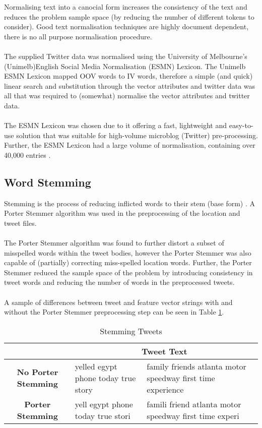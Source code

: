 \documentclass[11pt]{article}
\begin{document}
Normalising text into a canocial form increases the consistency of the text and reduces the problem sample space (by reducing the number of different tokens to consider). Good text normalisation techniques are highly document dependent, there is no all purpose normalisation procedure.\\\\
The supplied Twitter data was normalised using the University of Melbourne's (Unimelb)English Social Media Normalisation (ESMN) Lexicon. The Unimelb ESMN Lexicon mapped OOV words to IV words, therefore a simple (and quick) linear search and substitution through the vector attributes and twitter data was all that was required to (somewhat) normalise the vector attributes and twitter data.\\\\
The ESMN Lexicon was chosen due to it offering a fast, lightweight and easy-to-use solution that was suitable for high-volume microblog (Twitter) pre-processing. Further, the ESMN Lexicon had a large volume of normalisation, containing over 40,000 entries \citep{bald-ESMNL}. 

\subsection{Word Stemming}
\label{subsec:stem}

Stemming is the process of reducing inflicted words to their stem (base form) \citep{pm-stem}. A Porter Stemmer algorithm was used in the preprocessing of the location and tweet files. \\\\
The Porter Stemmer algorithm was found to further distort a subset of misspelled words within the tweet bodies, however the Porter Stemmer was also capable of (partially) correcting miss-spelled location words. Further, the Porter Stemmer reduced the sample space of the problem by introducing consistency in tweet words and reducing the number of words in the preprocessed tweets.\\\\
A sample of differences between tweet and feature vector strings with and without the Porter Stemmer preprocessing step can be seen in Table \ref{table:stem-tweet}.
   
\begin{table} [ht]
\caption{Stemming Tweets}
\begin{center}
	\begin{tabular}{| c | p{6cm} | p{6cm} |}
	\hline
	  & \multicolumn{2}{|c|}{\textbf{Tweet Text}}\\
	\hline
	\textbf{No Porter Stemming} & yelled egypt phone today true story & family friends atlanta motor speedway first time experience\\
	\hline
	\textbf{Porter Stemming}  & yell egypt phone today true stori & famili friend atlanta motor speedway first time experi \\
	\hline
	\end{tabular}
\end{center}
\label{table:stem-tweet}
\end{table}
\end{document}

